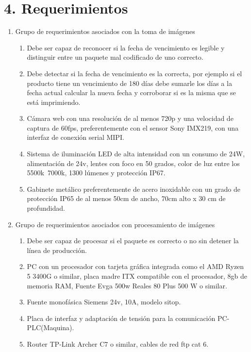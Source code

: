 \documentclass[11pt]{charter}
\begin{document}
\section{4. Requerimientos}
\label{sec:requerimientos}

\begin{enumerate}
\item Grupo de requerimientos asociados con la toma de imágenes
	\begin{enumerate}
	\item Debe ser capaz de reconocer si la fecha de vencimiento es legible y distinguir entre un paquete mal codificado de uno correcto.
	\item Debe detectar si la fecha de vencimiento es la correcta, por ejemplo si el producto tiene un vencimiento de 180 días debe sumarle los días a la fecha actual calcular la nueva fecha y corroborar si es la misma que se está imprimiendo. 
	\item Cámara web con una resolución de al menos 720p y una velocidad de captura de 60fps, preferentemente con el sensor Sony IMX219, con una interfaz de conexión serial MIPI.
	\item Sistema de iluminación LED de alta intensidad con un consumo de 24W, alimentación de 24v, lentes con foco en 50 grados, color de luz entre los 5500k~7000k, 1300 lúmenes y protección IP67.
	\item Gabinete metálico preferentemente de acero inoxidable con un grado de protección IP65 de al menos 50cm de ancho, 70cm alto x 30 cm de profundidad.
	\end{enumerate}
\item Grupo de requerimientos asociados con procesamiento de imágenes
	\begin{enumerate}
	\item Debe ser capaz de procesar si el paquete es correcto o no sin detener la línea de producción.
	\item PC con un procesador con tarjeta gráfica integrada como el AMD Ryzen 5 3400G o similar, placa madre ITX compatible con el procesador, 8gb de memoria RAM, Fuente Evga 500w Reales 80 Plus 500 W o similar.
	\item Fuente monofásica Siemens 24v, 10A, modelo sitop.
	\item Placa de interfaz y adaptación de tensión para la comunicación PC-PLC(Maquina).
	\item Router TP-Link Archer C7 o similar, cables de red ftp cat 6. 
	\end{enumerate}
\end{enumerate}
\end{document}
